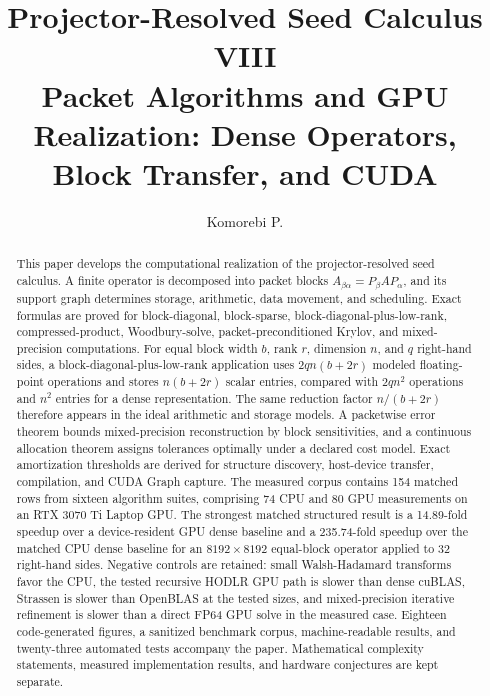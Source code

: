 \documentclass[11pt]{article}
\title{\textbf{Projector-Resolved Seed Calculus VIII}\\[0.45em]
\large Packet Algorithms and GPU Realization: Dense Operators, Block Transfer, and CUDA}
\author{Komorebi P.}
\date{}
\theoremstyle{definition}
\theoremstyle{remark}
\begin{document}
\maketitle

\begin{abstract}
This paper develops the computational realization of the projector-resolved seed calculus. A finite operator is decomposed into packet blocks $A_{\beta\alpha}=P_\beta A P_\alpha$, and its support graph determines storage, arithmetic, data movement, and scheduling. Exact formulas are proved for block-diagonal, block-sparse, block-diagonal-plus-low-rank, compressed-product, Woodbury-solve, packet-preconditioned Krylov, and mixed-precision computations. For equal block width $b$, rank $r$, dimension $n$, and $q$ right-hand sides, a block-diagonal-plus-low-rank application uses $2qn(b+2r)$ modeled floating-point operations and stores $n(b+2r)$ scalar entries, compared with $2qn^2$ operations and $n^2$ entries for a dense representation. The same reduction factor $n/(b+2r)$ therefore appears in the ideal arithmetic and storage models. A packetwise error theorem bounds mixed-precision reconstruction by block sensitivities, and a continuous allocation theorem assigns tolerances optimally under a declared cost model. Exact amortization thresholds are derived for structure discovery, host-device transfer, compilation, and CUDA Graph capture. The measured corpus contains 154 matched rows from sixteen algorithm suites, comprising 74 CPU and 80 GPU measurements on an RTX 3070 Ti Laptop GPU. The strongest matched structured result is a 14.89-fold speedup over a device-resident GPU dense baseline and a 235.74-fold speedup over the matched CPU dense baseline for an $8192\times8192$ equal-block operator applied to 32 right-hand sides. Negative controls are retained: small Walsh-Hadamard transforms favor the CPU, the tested recursive HODLR GPU path is slower than dense cuBLAS, Strassen is slower than OpenBLAS at the tested sizes, and mixed-precision iterative refinement is slower than a direct FP64 GPU solve in the measured case. Eighteen code-generated figures, a sanitized benchmark corpus, machine-readable results, and twenty-three automated tests accompany the paper. Mathematical complexity statements, measured implementation results, and hardware conjectures are kept separate.
\end{abstract}
\end{document}
